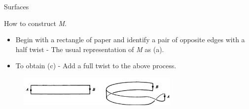 \documentclass{beamer}
\begin{document}
\begin{frame}{Surfaces}
  \begin{block}{}
    How to construct \textsl{M}.
    \begin{itemize}
    \item Begin with a rectangle of paper and identify a pair of opposite edges with a half twist - The usual representation of \textsl{M} as (a).
    \item To obtain (c) - Add a full twist to the above process.
    \end{itemize}
  \end{block}
  \begin{figure}
    \centering
    \includegraphics[width=0.7\textwidth]{figure_1_15.png}
    \caption{}
  \end{figure}
\end{frame}
\end{document}
